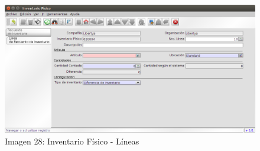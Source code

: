 \documentclass[letterpaper,10pt,spanish]{sphinxmanual}
\begin{document}
\begin{figure}[htbp]
\centering
\capstart

\includegraphics{ly_invfisico_2.png}
\caption{Imagen 28: Inventario Físico - Líneas}\end{figure}
\end{document}
